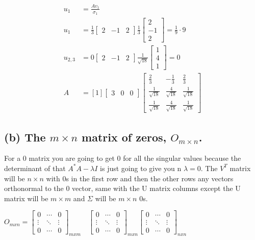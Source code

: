\documentclass[12pt, letterpaper]{article}
\begin{document}
\begin{align*}
    u_1 &= \frac{A v_1}{\sigma_1} \\
    u_1 &= \frac{1}{3} \begin{bmatrix} 2 & -1 & 2 \end{bmatrix} \frac{1}{3} \begin{bmatrix} 2 \\ -1 \\ 2 \end{bmatrix} = \frac{1}{9} \cdot 9 \\
    u_{2,3} &= 0 \begin{bmatrix} 2 & -1 & 2 \end{bmatrix} \frac{1}{\sqrt{18}} \begin{bmatrix} 1 \\ 4 \\ 1 \end{bmatrix} = 0 \\
    A &= \left[ 1 \right] \begin{bmatrix} 3 & 0 & 0 \end{bmatrix} \begin{bmatrix} \frac{2}{3} & -\frac{1}{3} & \frac{2}{3} \\ \frac{1}{\sqrt{18}} & \frac{4}{\sqrt{18}} & \frac{1}{\sqrt{18}} \\ \frac{1}{\sqrt{18}} & \frac{4}{\sqrt{18}} & \frac{1}{\sqrt{18}} \end{bmatrix}
\end{align*}

\subsection*{(b) The $m \times n$ matrix of zeros, $O_{m \times n}$.}

For a $0$ matrix you are going to get $0$ for all the singular values because the determinant of that $A^*A - \lambda I$ is just going to give you n $\lambda = 0$. The $V^T$ matrix will be $n \times n$ with 0s in the first row and then the other rows any vectors orthonormal to the 0 vector, same with the U matrix columns except the U matrix will be $m \times m$ and $\Sigma$ will be $m \times n$ $0$s.

$O_{mxn} = \left[ \begin{array}{ccc} 0 & \cdots & 0 \\ \vdots & \ddots & \vdots \\ 0 & \cdots & 0 \end{array} \right]_{mxm} \quad \left[ \begin{array}{ccc} 0 & \cdots & 0 \\ \vdots & \ddots & \vdots \\ 0 & \cdots & 0 \end{array} \right]_{mxn} \left[ \begin{array}{ccc} 0 & \cdots & 0 \\ \vdots & \ddots & \vdots \\ 0 & \cdots & 0 \end{array} \right]_{nxn}$
\end{document}
